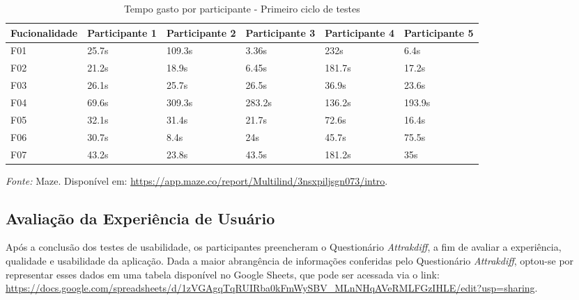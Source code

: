 \begin{table}[h!]
	\centering
	\caption{Tempo gasto por participante - Primeiro ciclo de testes}
	\label{tab06}
	\begin{adjustbox}{center}
	\begin{tabular}{l|l|l|l|l|l}
	\hline
	Fucionalidade & Participante 1 & Participante 2 & Participante 3 & Participante 4 & Participante 5 \\ 	\hline
	F01                   & 25.7s     & 109.3s     & 3.36s      & 232s       & 6.4s      \\
	F02                   & 21.2s        & 18.9s      & 6.45s      & 181.7s    & 17.2s     \\
	F03                   & 26.1s        & 25.7s      & 26.5s      & 36.9s     & 23.6s     \\
	F04                   & 69.6s        & 309.3s     & 283.2s     & 136.2s     & 193.9s     \\
	F05                   & 32.1s      & 31.4s      & 21.7s     & 72.6s     & 16.4s     \\
	F06                   & 30.7s     & 8.4s      & 24s     & 45.7s     & 75.5s     \\
	F07                   & 43.2s     & 23.8s      & 43.5s     & 181.2s    & 35s      \\ 	\hline
	\end{tabular}
	\end{adjustbox}
	\begin{tablenotes}[flushleft]
		\centering
		\item \textit{Fonte:} Maze. Disponível em: \url{https://app.maze.co/report/Multilind/3nsxpiljsgn073/intro}.
	  \end{tablenotes}
\end{table}

\subsection{Avaliação da Experiência de Usuário}
\label{sec:Avaliação da Experiência de Usuário}
Após a conclusão dos testes de usabilidade, os participantes preencheram o Questionário \textit{Attrakdiff}, a fim de 
avaliar a experiência, qualidade e usabilidade da aplicação. Dada a maior abrangência de informações conferidas pelo Questionário \textit{Attrakdiff}, optou-se por representar esses dados em uma tabela disponível no Google Sheets, que pode ser acessada via o link: 
\url{https://docs.google.com/spreadsheets/d/1zVGAgqTqRUIRba0kFmWySBV_MLnNHqAVeRMLFGzIHLE/edit?usp=sharing}. 

